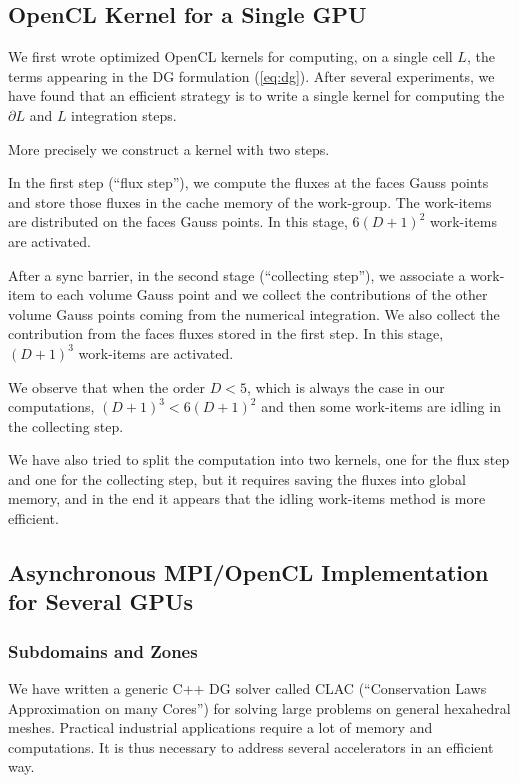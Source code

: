 \documentclass{svmult}
\begin{document}
\subsection{OpenCL Kernel for a Single GPU}
We first wrote optimized OpenCL kernels for computing, on a single
cell $L$, the terms appearing in the DG formulation (\ref{eq:dg}).
After several experiments, we have found that an efficient strategy is
to write a single kernel for computing the $\partial L$ and $L$
integration steps.

More precisely we construct a kernel with two steps.

In the first step (``flux step''), we compute the fluxes at the faces
Gauss points and store those fluxes in the cache memory of the
work-group. The work-items are distributed on the faces Gauss
points. In this stage, $6(D+1)^2$ work-items are activated.

After a sync barrier, in the second stage (``collecting step''), we
associate a work-item to each volume Gauss point and we collect the
contributions of the other volume Gauss points coming from the
numerical integration. We also collect the contribution from the faces
fluxes stored in the first step. In this stage, $(D+1)^3$ work-items
are activated.

We observe that when the order $D<5$, which is always the case in our
computations, $(D+1)^3 < 6 (D+1)^2$ and then some work-items are
idling in the collecting step.

We have also tried to split the computation into two kernels, one for
the flux step and one for the collecting step, but it requires saving
the fluxes into global memory, and in the end it appears that the
idling work-items method is more efficient.



\subsection{Asynchronous MPI/OpenCL Implementation for Several GPUs}

\subsubsection{Subdomains and Zones}
We have written a generic C++ DG solver called CLAC (``Conservation
Laws Approximation on many Cores'') for solving large problems on
general hexahedral meshes. Practical industrial applications require a
lot of memory and computations. It is thus necessary to address
several accelerators in an efficient way.
\end{document}
